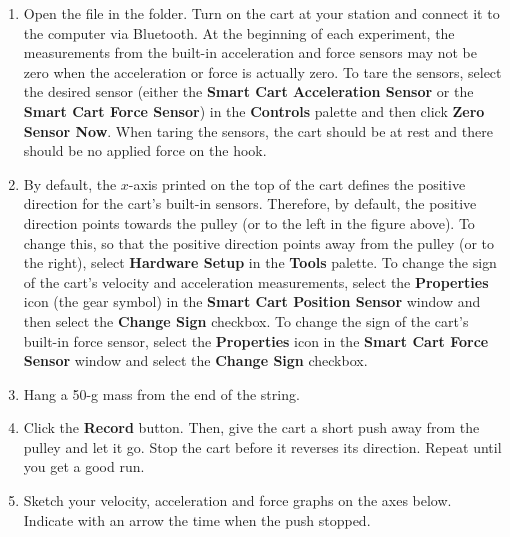 \begin{enumerate}
\item Open the file  in the \filename{\coursefolder} folder. Turn on the cart at your station and connect it to the computer via Bluetooth. At the beginning of each experiment, the measurements from the built-in acceleration and force sensors may not be zero when the acceleration or force is actually zero. To tare the sensors, select the desired sensor (either the \textbf{Smart Cart Acceleration Sensor} or the \textbf{Smart Cart Force Sensor}) in the \textbf{Controls} palette and then click \textbf{Zero Sensor Now}. When taring the sensors, the cart should be at rest and there should be no applied force on the hook.

\item By default, the $x$-axis printed on the top of the cart defines the positive direction for the cart's built-in sensors. Therefore, by default, the positive direction points towards the pulley (or to the left in the figure above). To change this, so that the positive direction points away from the pulley (or to the right), select \textbf{Hardware Setup} in the \textbf{Tools} palette. To change the sign of the cart's velocity and acceleration measurements, select the \textbf{Properties} icon (the gear symbol) in the \textbf{Smart Cart Position Sensor} window and then select the \textbf{Change Sign} checkbox. To change the sign of the cart's built-in force sensor, select the \textbf{Properties} icon in the \textbf{Smart Cart Force Sensor} window and select the \textbf{Change Sign} checkbox. 

\item Hang a 50-g mass from the end of the string.
 
\item Click the \textbf{Record} button. Then, give the cart a short push away from the pulley and let it go. Stop the cart before it reverses its direction. Repeat until you get a good run. 

\item Sketch your velocity, acceleration and force graphs on the axes below. 
Indicate with an arrow the time when the push
stopped.
\end{enumerate}

